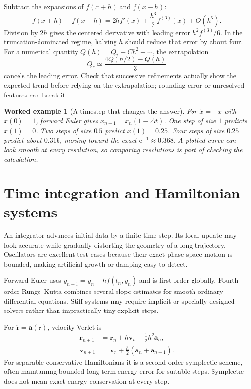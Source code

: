 \documentclass[11pt,oneside]{book}
\newcommand{\ee}{\mathrm{e}}
\newcommand{\vect}[1]{\boldsymbol{#1}}
\theoremstyle{reviewstyle}
\newtheorem{example}{Worked example}[chapter]
\begin{document}
Subtract the expansions of $f(x+h)$ and $f(x-h)$:
\begin{equation}
f(x+h)-f(x-h)=2hf'(x)+\frac{h^3}{3}f^{(3)}(x)+O(h^5).
\end{equation}
Division by $2h$ gives the centered derivative with leading error $h^2f^{(3)}/6$. In the truncation-dominated regime, halving $h$ should reduce that error by about four. For a numerical quantity $Q(h)=Q_*+Ch^2+\cdots$, the extrapolation
\begin{equation}
Q_*\simeq\frac{4Q(h/2)-Q(h)}3
\end{equation}
cancels the leading error. Check that successive refinements actually show the expected trend before relying on the extrapolation; rounding error or unresolved features can break it.

\begin{example}[A timestep that changes the answer]
For $\dot x=-x$ with $x(0)=1$, forward Euler gives $x_{n+1}=x_n(1-\Delta t)$. One step of size $1$ predicts $x(1)=0$. Two steps of size $0.5$ predict $x(1)=0.25$. Four steps of size $0.25$ predict about $0.316$, moving toward the exact $\ee^{-1}\approx0.368$. A plotted curve can look smooth at every resolution, so comparing resolutions is part of checking the calculation.
\end{example}

\section{Time integration and Hamiltonian systems}
An integrator advances initial data by a finite time step. Its local update may look accurate while gradually distorting the geometry of a long trajectory. Oscillators are excellent test cases because their exact phase-space motion is bounded, making artificial growth or damping easy to detect.

Forward Euler uses $y_{n+1}=y_n+h f(t_n,y_n)$ and is first-order globally. Fourth-order Runge--Kutta combines several slope estimates for smooth ordinary differential equations. Stiff systems may require implicit or specially designed solvers rather than impractically tiny explicit steps.

For $\ddot{\vect r}=\vect a(\vect r)$, velocity Verlet is
\begin{align}
\vect r_{n+1}&=\vect r_n+h\vect v_n+\tfrac12h^2\vect a_n,\\
\vect v_{n+1}&=\vect v_n+\tfrac h2(\vect a_n+\vect a_{n+1}).
\end{align}
For separable conservative Hamiltonians it is a second-order symplectic scheme, often maintaining bounded long-term energy error for suitable steps. Symplectic does not mean exact energy conservation at every step.
\end{document}
